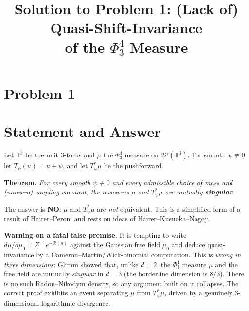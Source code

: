 \clearpage
\section*{Problem 1}
\begingroup
\hypersetup{colorlinks=true,
            linkcolor=blue!50!black,
            citecolor=blue!50!black,
            urlcolor=blue!50!black}
\newcommand{\qoneT}{\mathbb{T}}
\newcommand{\qoneR}{\mathbb{R}}
\newcommand{\qoneN}{\mathbb{N}}
\newcommand{\qoneC}{\mathcal{C}}
\newcommand{\qoneD}{\mathcal{D}}
\newcommand{\qoneE}{\mathbb{E}}
\newcommand{\qoneHp}{H}      %
\newcommand{\qonePN}{P_N}
\newcommand{\qoneLin}{\mathbf{l}}   %
\newcommand{\qoneLsq}{\mathbf{q}}   %
\newcommand{\qoneLcb}{\mathbf{c}}   %
\newcommand{\qoneIqc}{\mathbf{C}}   %
\newtheorem{qonetheorem}{Theorem}
\newtheorem{qonelemma}{Lemma}
\newtheorem{qoneproposition}{Proposition}
\newtheorem{qonecorollary}{Corollary}
\newtheorem{remark}{Remark}
\title{Solution to Problem 1: (Lack of) Quasi-Shift-Invariance\\
of the $\Phi^4_3$ Measure}
\author{}
\date{}
\maketitle


\section*{Statement and Answer}

Let $\qoneT^3$ be the unit $3$-torus and $\mu$ the $\Phi^4_3$ measure on
$\qoneD'(\qoneT^3)$. For smooth $\psi\not\equiv0$ let $T_\psi(u)=u+\psi$, and let
$T_\psi^*\mu$ be the pushforward.

\medskip
\noindent\textbf{Theorem.} \emph{For every smooth $\psi\not\equiv0$ and every
admissible choice of mass and (nonzero) coupling constant, the measures $\mu$ and
$T_\psi^*\mu$ are mutually \textbf{singular}.}

\medskip
\noindent The answer is \textbf{NO}: $\mu$ and $T_\psi^*\mu$ are \emph{not}
equivalent. This is a simplified form of a result of Hairer--Peroni and rests on
ideas of Hairer--Kusuoka--Nagoji.

\medskip
\noindent\textbf{Warning on a fatal false premise.} It is tempting to write
$d\mu/d\mu_0=Z^{-1}e^{-\mathcal R(u)}$ against the Gaussian free field $\mu_0$
and deduce quasi-invariance by a Cameron--Martin/Wick-binomial computation. This
is \emph{wrong in three dimensions}: Glimm showed that, unlike $d=2$, the
$\Phi^4_3$ measure $\mu$ and the free field are mutually \emph{singular} in
$d=3$ (the borderline dimension is $8/3$). There is no such Radon--Nikodym
density, so any argument built on it collapses. The correct proof exhibits an
event separating $\mu$ from $T_\psi^*\mu$, driven by a genuinely
$3$-dimensional logarithmic divergence.


